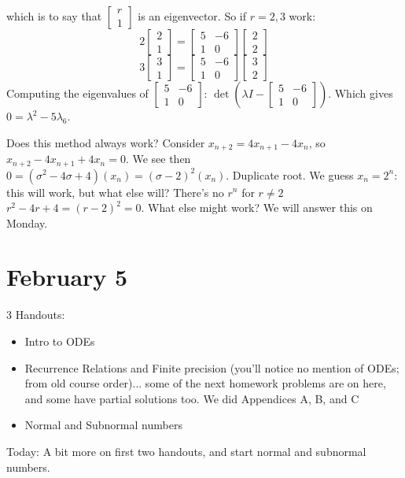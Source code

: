 \documentclass{article}
\theoremstyle{plain}
\theoremstyle{remark}
\begin{document}
which is to say that $\begin{bmatrix} r \\ 1 \end{bmatrix}$ is an eigenvector.
So if $r = 2,3$ work:
\[
	2\begin{bmatrix} 2 \\ 1 \end{bmatrix} = \begin{bmatrix} 5 & -6 \\ 1 & 0 \end{bmatrix}
	\begin{bmatrix} 2 \\ 2 \end{bmatrix}
\]
\[
	3\begin{bmatrix} 3 \\ 1 \end{bmatrix} = \begin{bmatrix} 5 & -6 \\ 1 & 0 \end{bmatrix}
	\begin{bmatrix} 3 \\ 2 \end{bmatrix}
\]
Computing the eigenvalues of $\begin{bmatrix} 5 & -6 \\ 1 & 0 \end{bmatrix}$:
$\det(\lambda I - \begin{bmatrix} 5 & -6 \\ 1 & 0 \end{bmatrix})$.
Which gives $0= \lambda^2 - 5\lambda _ 6$.

Does this method always work?
Consider $x_{n+2} = 4x_{n+1} - 4x_n$,
so $x_{n+2} - 4x_{n+1} + 4x_n = 0$.
We see then $0 = (\sigma^2-4\sigma+4)(x_n) = (\sigma-2)^2(x_n)$.
Duplicate root.
We guess $x_n = 2^n$: this will work, but what else will?
There's no $r^n$ for $r \neq 2$
$r^2 - 4r + 4 = (r-2)^2 = 0$.
What else might work?
We will answer this on Monday.

\section{February 5}
3 Handouts:
\begin{itemize}
	\item Intro to ODEs
	\item Recurrence Relations and Finite precision
		(you'll notice no mention of ODEs; from old course order)...
		some of the next homework problems are on here,
		and some have partial solutions too.
		We did Appendices A, B, and C
	\item Normal and Subnormal numbers
\end{itemize}
Today: A bit more on first two handouts, and start normal and subnormal numbers.
\end{document}
